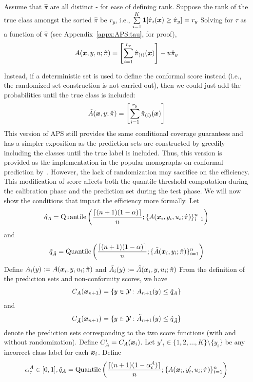 Assume that $\hat{\pi}$ are all distinct - for ease of defining rank.
Suppose the rank of the true class amongst the sorted $\hat{\pi}$ be $r_y$, i.e., $\sum\limits_{i=1}^K \bm{1}[\hat{\pi}_i({\bm{x}}) \geq \hat{\pi}_{y}] = r_y$
Solving for $\tau$ as a function of $\hat{\pi}$  (see Appendix~\ref{appx:APS:tau}, for proof),
\begin{align}
A({\bm{x}}, y, u;\hat{\pi}) = \left[ \sum\limits_{i=1}^{r_y} \hat{\pi}_{(i)}({\bm{x}}) \right] - u \hat{\pi}_{y}
\end{align}

Instead, if a deterministic set is used to define the conformal score instead (i.e., the randomized set construction is not carried out), then we could just add the probabilities until the true class is included:
\begin{align}
    \Tilde{A}({\bm{x}}, y;\hat{\pi}) = \left[ \sum\limits_{i=1}^{r_y} \hat{\pi}_{(i)}({\bm{x}}) \right]
\end{align}
This version of APS still provides the same conditional coverage guarantees and has a simpler exposition as the prediction sets are constructed by greedily including the classes until the true label is included.
 Thus, this version is provided as the implementation in the popular monographs on conformal prediction by~\citet{angelopoulos2021gentle, angelopoulos2023conformal}.
However, the lack of randomization may sacrifice on the efficiency. 
This modification of score affects both the quantile threshold computation during the calibration phase and the prediction set during the test phase.
We will now show the conditions that impact the efficiency more formally.
Let 
\[
    \hat{q}_{A} = \text{Quantile}\left(\frac{\lceil(n+1)(1-\alpha)\rceil}{n}; \{A({\bm{x}}_i, y_i, u_i; \hat{\pi})\}_{i=1}^{n}\right)
\]
and
\[
    \hat{q}_{\Tilde{A}} = \text{Quantile}\left(\frac{\lceil(n+1)(1-\alpha)\rceil}{n}; \{\Tilde{A}({\bm{x}}_i, y_i; \hat{\pi})\}_{i=1}^{n}\right)
\]
Define $A_i(y) := A({\bm{x}}_i, y, u_i; \hat{\pi})$ and $\Tilde{A}_i(y) := \Tilde{A}({\bm{x}}_i, y, u_i; \hat{\pi})$
From the definition of the prediction sets and non-conformity scores, we have 
\[
    C_A({\bm{x}}_{n+1}) = \{y \in {\mathcal{Y}}: A_{n+1}(y) \leq \hat{q}_{A}\}
\] and 
\[
    C_{\Tilde{A}}({\bm{x}}_{n+1}) = \{y \in {\mathcal{Y}}: \Tilde{A}_{n+1}(y) \leq \hat{q}_{\Tilde{A}}\}
\] 
denote the prediction sets corresponding to the two score functions (with and without randomization).
Define $C_{A}^{i} = C_{A}({\bm{x}}_{i})$. 
Let $y'_i \in \{1, 2, \dots, K\} \setminus \{y_i\}$ be any incorrect class label for each ${\bm{x}}_i$.
Define 
\[
    \alpha_c^A \in [0, 1], \hat{q}_A = \text{Quantile}\left( \frac{\lceil(n+1)(1 - \alpha_c^A)\rceil}{n}; \{A({\bm{x}}_i, y'_i, u_i; \hat{\pi})\}_{i=1}^n \right)
\]
